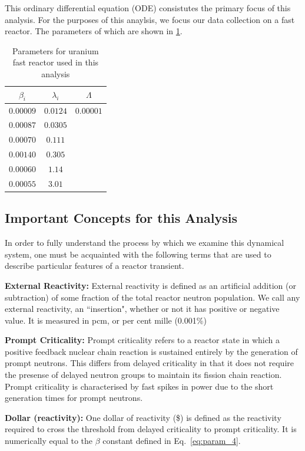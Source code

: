 \documentclass[review,onefignum,onetabnum]{siamart171218}
\begin{document}
This ordinary differential equation (ODE) consistutes the primary focus of this
analysis. \cite{Dynamics}
For the purposes of this anaylsis, we focus our data collection on a 
fast reactor. The parameters of which are shown in \cref{tab:reactor_params}.
\begin{table}
  \begin{center}
    \begin{tabular}{c|c|c}
      $\beta_i$&$\lambda_i$&$\Lambda$\\
      \hline
      $0.00009$&$0.0124$&$0.00001$\\
      $0.00087$&$0.0305$&\\
      $0.00070$&$0.111$&\\
      $0.00140$&$0.305$&\\
      $0.00060$&$1.14$&\\
      $0.00055$&$3.01$&\\
    \end{tabular}
    \caption{Parameters for uranium fast reactor used in this analysis}
    \label{tab:reactor_params}
  \end{center}
\end{table}

\subsection{Important Concepts for this Analysis}
In order to fully understand the process by which we examine this dynamical system,
one must be acquainted with the following terms that are used to describe particular
features of a reactor transient.
\begin{definition}{\textbf{External Reactivity:}}
  External reactivity is defined as an artificial addition (or subtraction) of
  some fraction of the total reactor neutron population. We call any external reactivity,
  an ``insertion", whether or not it has positive or negative value. It is measured in pcm,
  or per cent mille (0.001\%)
\end{definition}
\begin{definition}{\textbf{Prompt Criticality:}}
  Prompt criticality refers to a reactor state in which a positive feedback nuclear
  chain reaction is sustained entirely by the generation of prompt neutrons.
  This differs from delayed criticality in that it does not require the presense of
  delayed neutron groups to maintain its fission chain reaction. Prompt criticality
  is characterised by fast spikes in power due to the short generation times for
  prompt neutrons.
\end{definition}
\begin{definition}{\textbf{Dollar (reactivity):}}
  One dollar of reactivity (\$) is defined as the reactivity required to cross the
  threshold from delayed criticality to prompt criticality. It is numerically equal
  to the $\beta$ constant defined in Eq.~\cref{eq:param_4}.
\end{definition}
\end{document}
